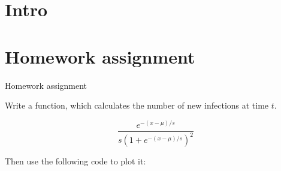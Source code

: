 
\subtitle{Start programming in Python}
\date{2020-04-02}


\begin{frame}
	\tableofcontents
\end{frame}

\section{Intro}


\section{Homework assignment}

\begin{frame}[fragile]{Homework assignment}

    Write a function, which calculates the number of new infections at time $t$.

    \[
        \frac{e^{-(x-\mu)/s}} {s\left(1+e^{-(x-\mu)/s}\right)^2}
    \]

    Then use the following code to plot it:
\end{frame}


